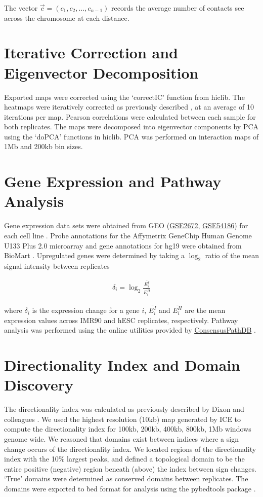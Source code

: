 The vector $\vec{c} = \left(c_1, c_2, \hdots, c_{n-1}\right)$ records the average number of contacts see across the chromosome
at each distance.

\section*{Iterative Correction and Eigenvector Decomposition}

Exported maps were corrected using the `correctIC' function from hiclib.  The heatmaps were iteratively corrected as previously
described \citep{imakaev2012}, at an average of 10 iterations per map.  Pearson correlations were calculated between each sample
for both replicates.  The maps were decomposed into eigenvector components by \gls{PCA} using the `doPCA' functions in hiclib.
\gls{PCA} was performed on interaction maps of 1Mb and 200kb bin sizes.

\section*{Gene Expression and Pathway Analysis}

Gene expression data sets were obtained from \gls{GEO} (\href{http://www.ncbi.nlm.nih.gov/geo/query/acc.cgi?acc=GSE2672}{GSE2672},
\href{http://www.ncbi.nlm.nih.gov/geo/query/acc.cgi?acc=GSE54186}{GSE54186}) for each cell line \citep{kim2005} \citep{kim2014}.  Probe
annotations for the Affymetrix GeneChip Human Genome U133 Plus 2.0 microarray and gene annotations for hg19 were obtained from
BioMart \citep{kasprzyk2011}.  Upregulated genes were determined by taking a $\log_2$ ratio of the mean signal intensity between
replicates

\begin{align}
  \delta_i = \log_2{\frac{\bar{E_i^I}}{\bar{E_i^H}}}
\end{align}

where $\delta_i$ is the expression change for a gene $i$, $\bar{E_i^I}$ and $\bar{E_i^H}$ are the mean expression values across
IMR90 and hESC replicates, respectively.  Pathway analysis was performed using the online utilities provided by
\href{http://consensuspathdb.org/}{ConsensusPathDB} \citep{kamburov2012}.

\section*{Directionality Index and Domain Discovery}

The directionality index was calculated as previously described by Dixon and colleagues \citep{dixon2012}.  We used the highest
resolution (10kb) map generated by \gls{ICE} to compute the directionality index for 100kb, 200kb, 400kb, 800kb, 1Mb windows
genome wide.  We reasoned that domains exist between indices where a sign change occurs of the directionality index.  We located
regions of the directionality index with the 10\% largest peaks, and defined a topological domain to be the entire positive (negative)
region beneath (above) the index between sign changes.   `True' domains were determined as conserved domains between replicates.
The domains were exported to \.bed format for analysis using the pybedtools package \citep{quinlan2010,dale2011}.

